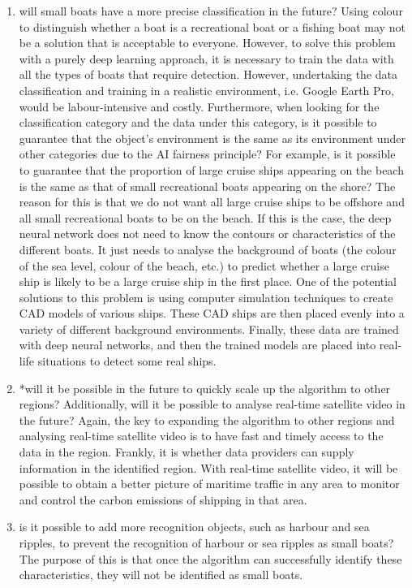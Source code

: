 \begin{enumerate}
    \item will small boats have a more precise classification in the future? Using colour to distinguish whether a boat is a recreational boat or a fishing boat may not be a solution that is acceptable to everyone. However, to solve this problem with a purely deep learning approach, it is necessary to train the data with all the types of boats that require detection. However, undertaking the data classification and training in a realistic environment, i.e. Google Earth Pro, would be labour-intensive and costly. Furthermore, when looking for the classification category and the data under this category, is it possible to guarantee that the object's environment is the same as its environment under other categories due to the AI fairness principle? For example, is it possible to guarantee that the proportion of large cruise ships appearing on the beach is the same as that of small recreational boats appearing on the shore? The reason for this is that we do not want all large cruise ships to be offshore and all small recreational boats to be on the beach. If this is the case, the deep neural network does not need to know the contours or characteristics of the different boats. It just needs to analyse the background of boats (the colour of the sea level, colour of the beach, etc.) to predict whether a large cruise ship is likely to be a large cruise ship in the first place. One of the potential solutions to this problem is using computer simulation techniques to create CAD models of various ships. These CAD ships are then placed evenly into a variety of different background environments. Finally, these data are trained with deep neural networks, and then the trained models are placed into real-life situations to detect some real ships.
    
    \item *will it be possible in the future to quickly scale up the algorithm to other regions? Additionally, will it be possible to analyse real-time satellite video in the future? Again, the key to expanding the algorithm to other regions and analysing real-time satellite video is to have fast and timely access to the data in the region. Frankly, it is whether data providers can supply information in the identified region. With real-time satellite video, it will be possible to obtain a better picture of maritime traffic in any area to monitor and control the carbon emissions of shipping in that area.
    
    \item is it possible to add more recognition objects, such as harbour and sea ripples, to prevent the recognition of harbour or sea ripples as small boats? The purpose of this is that once the algorithm can successfully identify these characteristics, they will not be identified as small boats.
    

\end{enumerate}
